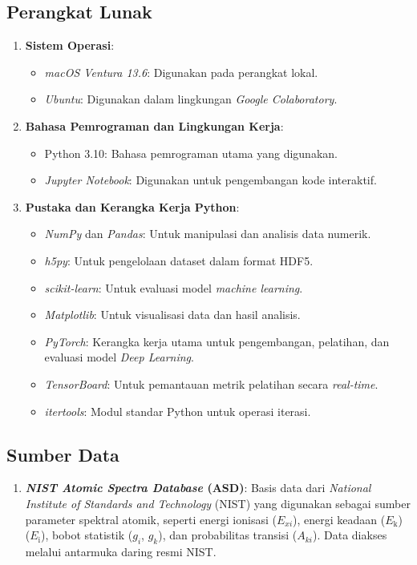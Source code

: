 \subsection{Perangkat Lunak}
\begin{enumerate}
  \item \textbf{Sistem Operasi}:
  \begin{itemize}
    \item \textit{macOS Ventura 13.6}: Digunakan pada perangkat lokal.
    \item \textit{Ubuntu}: Digunakan dalam lingkungan \textit{Google Colaboratory}.
  \end{itemize}
  
  \item \textbf{Bahasa Pemrograman dan Lingkungan Kerja}:
  \begin{itemize}
    \item Python 3.10: Bahasa pemrograman utama yang digunakan.
    \item \textit{Jupyter Notebook}: Digunakan untuk pengembangan kode interaktif.
  \end{itemize}
  
  \item \textbf{Pustaka dan Kerangka Kerja Python}:
  \begin{itemize}
    \item \textit{NumPy} dan \textit{Pandas}: Untuk manipulasi dan analisis data numerik.
    \item \textit{h5py}: Untuk pengelolaan dataset dalam format HDF5.
    \item \textit{scikit-learn}: Untuk evaluasi model \textit{machine learning}.
    \item \textit{Matplotlib}: Untuk visualisasi data dan hasil analisis.
    \item \textit{PyTorch}: Kerangka kerja utama untuk pengembangan, pelatihan, dan evaluasi model \textit{Deep Learning}.
    \item \textit{TensorBoard}: Untuk pemantauan metrik pelatihan secara \textit{real-time}.
    \item \textit{itertools}: Modul standar Python untuk operasi iterasi.
  \end{itemize}
\end{enumerate}

\subsection{Sumber Data}
\begin{enumerate}
\item \textbf{\textit{NIST Atomic Spectra Database} (ASD)}: Basis data dari \textit{National Institute of Standards and Technology} (NIST) yang digunakan sebagai sumber parameter spektral atomik, seperti energi ionisasi (\(E_{xi}\)), energi keadaan (\(E_\text{k}\)) (\(E_\text{i}\)), bobot statistik (\(g_i\), \(g_k\)), dan probabilitas transisi (\(A_{ki}\)). Data diakses melalui antarmuka daring resmi NIST.
\end{enumerate}


